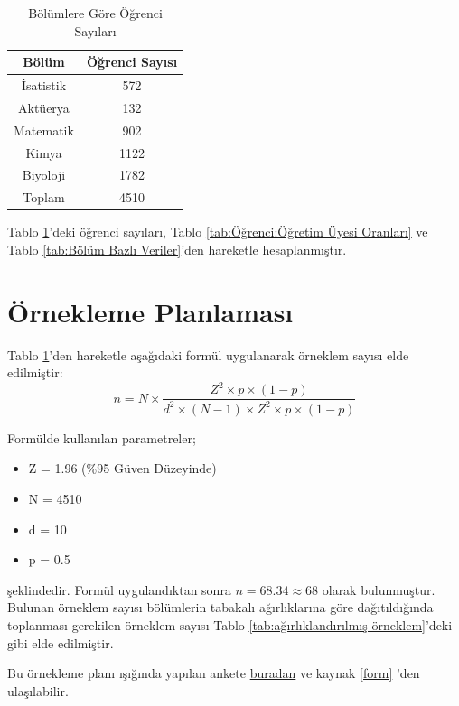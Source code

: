 \documentclass{article}
\begin{document}
\clearpage

\begin{table}[h]
    \centering
    \caption{Bölümlere Göre Öğrenci Sayıları}
    \label{tab:Bölüm bazlı öğrenci sayıları}
    \begin{tabular}{|c|c|}
        \hline
        Bölüm & Öğrenci Sayısı\\
        \hline
        İsatistik & 572 \\
        Aktüerya & 132 \\
        Matematik & 902 \\
        Kimya & 1122 \\
        Biyoloji & 1782 \\
        \hline
        Toplam & 4510 \\
        \hline
    \end{tabular}
\end{table}

Tablo \ref{tab:Bölüm bazlı öğrenci sayıları}'deki öğrenci sayıları, Tablo \ref{tab:Öğrenci:Öğretim Üyesi Oranları} ve Tablo \ref{tab:Bölüm Bazlı Veriler}'den hareketle hesaplanmıştır. 

\vspace{10pt}
\section{Örnekleme Planlaması}
Tablo \ref{tab:Bölüm bazlı öğrenci sayıları}'den hareketle aşağıdaki formül uygulanarak örneklem sayısı elde edilmiştir:
$$
n = N \times \frac{Z^2 \times p \times (1-p)}{d^2 \times (N-1) \times Z^2 \times p \times (1-p)}
$$

Formülde kullanılan parametreler;
\begin{itemize}
    \item Z = 1.96 (\%95 Güven Düzeyinde)
    \item N = 4510
    \item d = 10
    \item p = 0.5
\end{itemize} şeklindedir. Formül uygulandıktan sonra $n=68.34 \approx 68$ olarak bulunmuştur. Bulunan örneklem sayısı bölümlerin tabakalı ağırlıklarına göre dağıtıldığında toplanması gerekilen örneklem sayısı Tablo \ref{tab:ağırlıklandırılmış örneklem}'deki gibi elde edilmiştir.

Bu örnekleme planı ışığında yapılan ankete \href{https://docs.google.com/forms/d/e/1FAIpQLSf7CBA1tg89lFSdAl9VRSa4vjmv8COCJtRDvQmYa0n0l72JUA/viewform?usp=sf_link}{buradan} ve kaynak \ref{form} 'den ulaşılabilir. 
\end{document}
